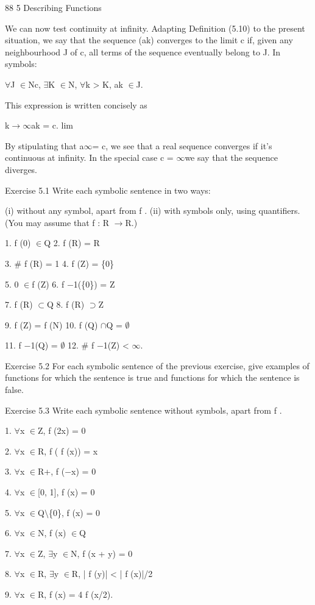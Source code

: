 \documentclass[11pt]{article}
\theoremstyle{plain}
\theoremstyle{definition}
\begin{document}
88 5 Describing Functions

We can now test continuity at infinity. Adapting Definition (5.10) to the present situation, we say that the sequence (ak) converges to the limit c if, given any neighbourhood J of c, all terms of the sequence eventually belong to J. In symbols:

$\forall$J $\in$Nc, $\exists$K $\in$N, $\forall$k > K, ak $\in$J.

This expression is written concisely as

k$\to$$\infty$ak = c. lim

By stipulating that a$\infty$= c, we see that a real sequence converges if it's continuous at infinity. In the special case c = $\infty$we say that the sequence diverges.

Exercise 5.1 Write each symbolic sentence in two ways:

(i) without any symbol, apart from f . (ii) with symbols only, using quantifiers. (You may assume that f : R $\to$R.)

1. f (0) $\in$Q 2. f (R) = R

3. \# f (R) = 1 4. f (Z) = \{0\}

5. 0 $\in$f (Z) 6. f $-$1(\{0\}) = Z

7. f (R) $\subset$Q 8. f (R) $\supset$Z

9. f (Z) = f (N) 10. f (Q) $\cap$Q = $\emptyset$

11. f $-$1(Q) = $\emptyset$ 12. \# f $-$1(Z) < $\infty$.

Exercise 5.2 For each symbolic sentence of the previous exercise, give examples of functions for which the sentence is true and functions for which the sentence is false.

Exercise 5.3 Write each symbolic sentence without symbols, apart from f .

1. $\forall$x $\in$Z, f (2x) = 0

2. $\forall$x $\in$R, f ( f (x)) = x

3. $\forall$x $\in$R+, f ($-$x) = 0

4. $\forall$x $\in$[0, 1], f (x) = 0

5. $\forall$x $\in$Q$\setminus$\{0\}, f (x) = 0

6. $\forall$x $\in$N, f (x) $\in$Q

7. $\forall$x $\in$Z, $\exists$y $\in$N, f (x + y) = 0

8. $\forall$x $\in$R, $\exists$y $\in$R, | f (y)| < | f (x)|/2

9. $\forall$x $\in$R, f (x) = 4 f (x/2).
\end{document}
